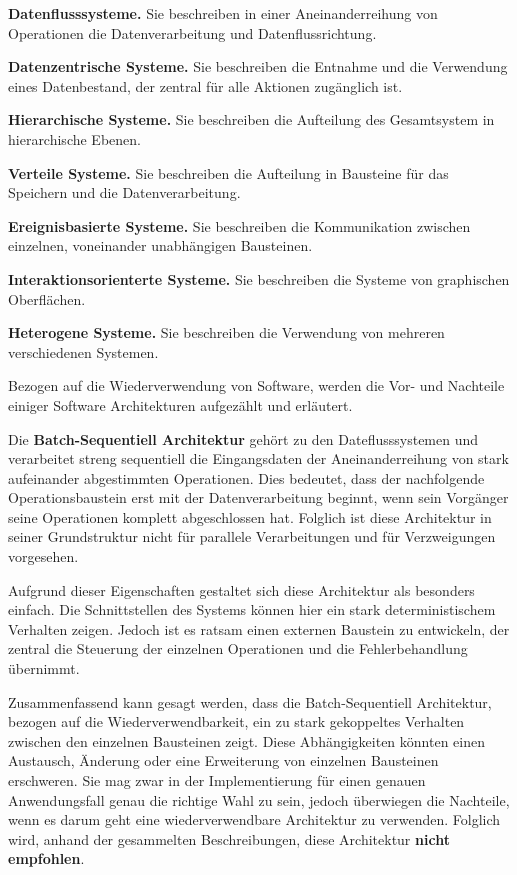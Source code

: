 \documentclass[utf8,biblatex]{lni}
\begin{document}
\textbf{Datenflusssysteme.} Sie beschreiben in einer Aneinanderreihung von Operationen die Datenverarbeitung und Datenflussrichtung.

\textbf{Datenzentrische Systeme.} Sie beschreiben die Entnahme und die Verwendung eines Datenbestand, der zentral für alle Aktionen zugänglich ist.

\textbf{Hierarchische Systeme.} Sie beschreiben die Aufteilung des Gesamtsystem in hierarchische Ebenen.

\textbf{Verteile Systeme.} Sie beschreiben die Aufteilung in Bausteine für das Speichern und die Datenverarbeitung.

\textbf{Ereignisbasierte Systeme.} Sie beschreiben die Kommunikation zwischen einzelnen, voneinander unabhängigen Bausteinen.

\textbf{Interaktionsorienterte Systeme.} Sie beschreiben die Systeme von graphischen Oberflächen.

\textbf{Heterogene Systeme.} Sie beschreiben die Verwendung von mehreren verschiedenen Systemen.

Bezogen auf die Wiederverwendung von Software, werden die Vor- und
Nachteile einiger Software Architekturen aufgezählt und erläutert.


Die \textbf{Batch-Sequentiell Architektur} gehört zu den Dateflusssystemen und verarbeitet streng sequentiell die Eingangsdaten der Aneinanderreihung von stark aufeinander abgestimmten Operationen. Dies bedeutet, dass der nachfolgende Operationsbaustein erst mit der Datenverarbeitung beginnt, wenn sein Vorgänger seine Operationen komplett abgeschlossen hat. Folglich ist diese Architektur in seiner Grundstruktur nicht für parallele Verarbeitungen und für Verzweigungen vorgesehen.

Aufgrund dieser Eigenschaften gestaltet sich diese Architektur als besonders einfach. Die Schnittstellen des Systems können hier ein stark deterministischem Verhalten zeigen. Jedoch ist es ratsam einen externen Baustein zu entwickeln, der zentral die Steuerung der einzelnen Operationen und die Fehlerbehandlung übernimmt.

Zusammenfassend kann gesagt werden, dass die Batch-Sequentiell Architektur, bezogen auf die Wiederverwendbarkeit, ein zu stark gekoppeltes Verhalten zwischen den einzelnen Bausteinen zeigt. Diese Abhängigkeiten könnten einen Austausch, Änderung oder eine Erweiterung von einzelnen Bausteinen erschweren. Sie mag zwar in der Implementierung für einen genauen Anwendungsfall genau die richtige Wahl zu sein, jedoch überwiegen die Nachteile, wenn es darum geht eine wiederverwendbare Architektur zu verwenden. Folglich wird, anhand der gesammelten Beschreibungen, diese Architektur \textbf{nicht empfohlen}.
\end{document}
